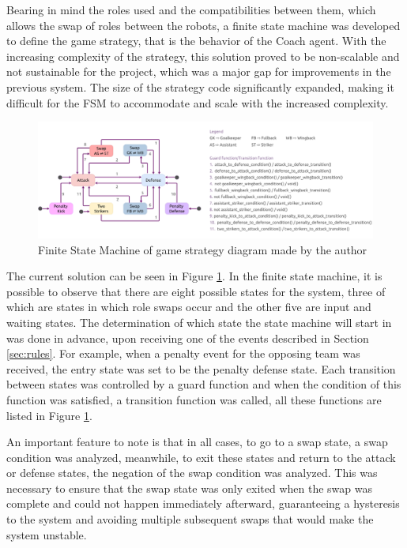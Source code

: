 Bearing in mind the roles used and the compatibilities between them, which allows the swap of roles between the robots, a finite state machine was developed to define the game strategy, that is the behavior of the Coach agent. With the increasing complexity of the strategy, this solution proved to be non-scalable and not sustainable for the project, which was a major gap for improvements in the previous system. The size of the strategy code significantly expanded, making it difficult for the FSM to accommodate and scale with the increased complexity.

\begin{figure}[!h]
    \centering
    \includegraphics[width=\linewidth]{images/BehaviorsController FSM.png}
    \caption{Finite State Machine of game strategy diagram made by the author}
    \label{fig:behaviors_controller_fsm}
\end{figure}

The current solution can be seen in Figure \ref{fig:behaviors_controller_fsm}. In the finite state machine, it is possible to observe that there are eight possible states for the system, three of which are states in which role swaps occur and the other five are input and waiting states. The determination of which state the state machine will start in was done in advance, upon receiving one of the events described in Section \ref{sec:rules}. For example, when a penalty event for the opposing team was received, the entry state was set to be the penalty defense state. Each transition between states was controlled by a guard function and when the condition of this function was satisfied, a transition function was called, all these functions are listed in Figure \ref{fig:behaviors_controller_fsm}.

An important feature to note is that in all cases, to go to a swap state, a swap condition was analyzed, meanwhile, to exit these states and return to the attack or defense states, the negation of the swap condition was analyzed. This was necessary to ensure that the swap state was only exited when the swap was complete and could not happen immediately afterward, guaranteeing a hysteresis to the system and avoiding multiple subsequent swaps that would make the system unstable.
